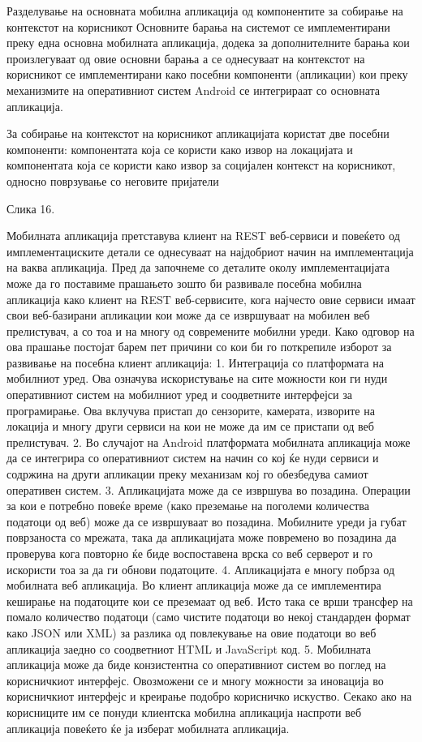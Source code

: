 Разделување на основната мобилна апликација од компонентите за
собирање на контекстот на корисникот Основните барања на системот се
имплементирани преку една основна мобилната апликација, додека за дополнителните
барања кои произлегуваат од овие основни барања а се однесуваат на контекстот на
корисникот се имплементирани како посебни компоненти (апликации) кои преку
механизмите на оперативниот систем Android се интегрираат со основната
апликација. 

За собирање на контекстот на корисникот апликацијата користат две
посебни компоненти: компонентата која се користи како извор на локацијата и
компонентата која се користи како извор за социјален контекст на корисникот,
односно поврзување со неговите пријатели

 Слика 16. 
 
 Мобилната апликација
претставува клиент на REST веб-сервиси и повеќето од имплементациските детали се
однесуваат на најдобриот начин на имплементација на ваква апликација. Пред да
започнеме со деталите околу имплементацијата може да го поставиме прашањето
зошто би развивале посебна мобилна апликација како клиент на REST веб-сервисите,
кога најчесто овие сервиси имаат свои веб-базирани апликации кои може да се
извршуваат на мобилен веб прелистувач, а со тоа и на многу од современите
мобилни уреди. Како одговор на ова прашање постојат барем пет причини со кои би
го поткрепиле изборот за развивање на посебна клиент апликација: 1.  Интеграција
со платформата на мобилниот уред. Ова означува искористување на сите можности
кои ги нуди оперативниот систем на мобилниот уред и соодветните интерфејси за
програмирање. Ова вклучува пристап до сензорите, камерата, изворите на локација
и многу други сервиси на кои не може да им се пристапи од веб прелистувач. 2. 
Во случајот на Android платформата мобилната апликација може да се интегрира со
оперативниот систем на начин со кој ќе нуди сервиси и содржина на други
апликации преку механизам кој го обезбедува самиот оперативен систем. 3. 
Апликацијата може да се извршува во позадина. Операции за кои е потребно повеќе
време (како преземање на поголеми количества податоци од веб) може да се
извршуваат во позадина. Мобилните уреди ја губат поврзаноста со мрежата, така да
апликацијата може повремено во позадина да проверува кога повторно ќе биде
воспоставена врска со веб серверот и го искористи тоа за да ги обнови
податоците. 4.  Апликацијата е многу побрза од мобилната веб апликација. Во
клиент апликација може да се имплементира кеширање на податоците кои се
преземаат од веб. Исто така се врши трансфер на помало количество податоци (само
чистите податоци во некој стандарден формат како JSON или XML) за разлика од
повлекување на овие податоци во веб апликација заедно со соодветниот HTML и
JavaScript код. 5.  Мобилната апликација може да биде конзистентна со
оперативниот систем во поглед на корисничкиот интерфејс. Овозможени се и многу
можности за иновација во корисничкиот интерфејс и креирање подобро корисничко
искуство. Секако ако на корисниците им се понуди клиентска мобилна апликација
наспроти веб апликација повеќето ќе ја изберат мобилната апликација.
 
